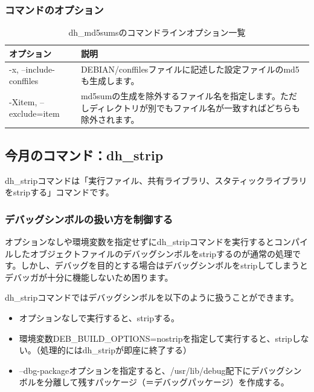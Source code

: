 \documentclass[mingoth,a4paper]{jsarticle}
\begin{document}
\subsubsection{コマンドのオプション}

\begin{table}[ht]
\caption{dh\_md5sumsのコマンドラインオプション一覧}
\begin{center}
\small
\begin{tabular}{|p{12em}|p{33em}|}

\hline
オプション&説明 \\
\hline
-x,  --include-conffiles & DEBIAN/conffilesファイルに記述した設定ファイルのmd5も生成します。\\
\hline
-Xitem, --exclude=item & md5sumの生成を除外するファイル名を指定します。ただしディレクトリが別でもファイル名が一致すればどちらも除外されます。 \\
\end{tabular}
\end{center}
\end{table}

\subsection{今月のコマンド：dh\_strip}

dh\_stripコマンドは「実行ファイル、共有ライブラリ、スタティックライブラリをstripする」コマンドです。

\subsubsection{デバッグシンボルの扱い方を制御する}
オプションなしや環境変数を指定せずにdh\_stripコマンドを実行するとコンパイルしたオブジェクトファイルのデバッグシンボルをstripするのが通常の処理です。しかし、デバッグを目的とする場合はデバッグシンボルをstripしてしまうとデバッガが十分に機能しないため困ります。

dh\_stripコマンドではデバッグシンボルを以下のように扱うことができます。\cite{debugpackage}

\begin{itemize}
 \item オプションなしで実行すると、stripする。
 \item 環境変数DEB\_BUILD\_OPTIONS=nostripを指定して実行すると、stripしない。（処理的にはdh\_stripが即座に終了する）
 \item --dbg-packageオプションを指定すると、/usr/lib/debug配下にデバッグシンボルを分離して残すパッケージ（＝デバッグパッケージ）を作成する。
\end{itemize}
\end{document}
